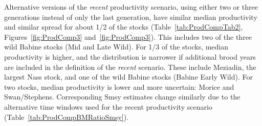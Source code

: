 \documentclass[french,11pt]{book}
\begin{document}
Alternative versions of the \emph{recent} productivity scenario, using either two or three generations instead of only the last generation, have similar median productivity and similar spread for about 1/2 of the stocks (Table~\ref{tab:ProdCompTab2}, Figures~\ref{fig:ProdComp3} and~\ref{fig:ProdComp3}). This includes two of the three wild Babine stocks (Mid and Late Wild). For 1/3 of the stocks, median productivity is higher, and the distribution is narrower if additional brood years are included in the definition of the \emph{recent} scenario. These include Meziadin, the largest Nass stock, and one of the wild Babine stocks (Babine Early Wild). For two stocks, median productivity is lower and more uncertain: Morice and Swan/Stephens. Corresponding Smsy estimates change similarly due to the alternative time windows used for the recent productivity scenario (Table~\ref{tab:ProdCompBMRatioSmsy}).

\clearpage
\end{document}
